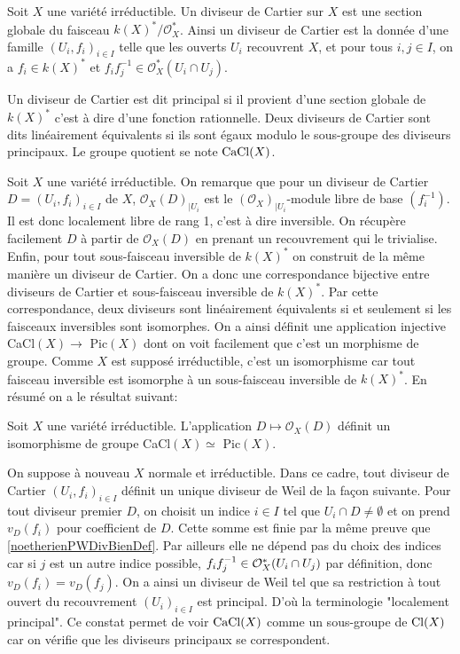 \begin{defn}
Soit $X$ une variété irréductible. Un diviseur de Cartier sur $X$ est une section globale du faisceau $k(X)^*/\mathcal{O}_X^*$. Ainsi un diviseur de Cartier est la donnée d'une famille $(U_i, f_i)_{i\in I}$ telle que les ouverts $U_i$ recouvrent $X$, et pour tous $i,j \in I$, on a $f_i\in k(X)^*$ et $f_if_j^{-1}\in \mathcal{O}_X^*(U_i\cap U_j)$.

Un diviseur de Cartier est dit principal si il provient d'une section globale de $k(X)^*$ c'est à dire d'une fonction rationnelle. Deux diviseurs de Cartier sont dits linéairement équivalents si ils sont égaux modulo le sous-groupe des diviseurs principaux. Le groupe quotient se note $\operatorname{CaCl}(X)$.
\end{defn}





Soit $X$ une variété irréductible. On remarque que pour un diviseur de Cartier $D=(U_i, f_i)_{i\in I}$ de $X$, $\mathcal{O}_X(D)_{|U_i}$ est le $(\mathcal{O}_X)_{|U_i}$-module libre de base $(f_i^{-1})$. Il est donc localement libre de rang 1, c'est à dire inversible. On récupère facilement $D$ à partir de $\mathcal{O}_X(D)$ en prenant un recouvrement qui le trivialise. Enfin, pour tout sous-faisceau inversible de $k(X)^*$ on construit de la même manière un diviseur de Cartier. On a donc une correspondance bijective entre diviseurs de Cartier et sous-faisceau inversible de $k(X)^*$. Par cette correspondance, deux diviseurs sont linéairement équivalents si et seulement si les faisceaux inversibles sont isomorphes. On a ainsi définit une application injective CaCl$(X)\rightarrow$ Pic$(X)$ dont on voit facilement que c'est un morphisme de groupe. Comme $X$ est supposé irréductible, c'est un isomorphisme car tout faisceau inversible est isomorphe à un sous-faisceau inversible de $k(X)^*$. En résumé on a le résultat suivant:


\begin{prop}\label{isopic}
Soit $X$ une variété irréductible. L'application $D\mapsto \mathcal{O}_X(D)$ définit un isomorphisme de groupe CaCl$(X)\simeq $ Pic$(X)$.
\end{prop}


On suppose à nouveau $X$ normale et irréductible. Dans ce cadre, tout diviseur de Cartier $(U_i, f_i)_{i\in I}$ définit un unique diviseur de Weil de la façon suivante. Pour tout diviseur premier $D$, on choisit un indice $i\in I$ tel que $U_i\cap D\neq \emptyset$ et on prend $v_D(f_i)$ pour coefficient de $D$. Cette somme est finie par la même preuve que \ref{noetherienPWDivBienDef}. Par ailleurs elle ne dépend pas du choix des indices car si $j$ est un autre indice possible, $f_if_j^{-1}\in \mathcal{O}_X^*(U_i\cap U_j)$ par définition, donc $v_D(f_i)=v_D(f_j)$. On a ainsi un diviseur de Weil tel que sa restriction à tout ouvert du recouvrement $(U_i)_{i\in I}$ est principal. D'où la terminologie "localement principal". Ce constat permet de voir $\operatorname{CaCl}(X)$ comme un sous-groupe de $\operatorname{Cl}(X)$ car on vérifie que les diviseurs principaux se correspondent.


